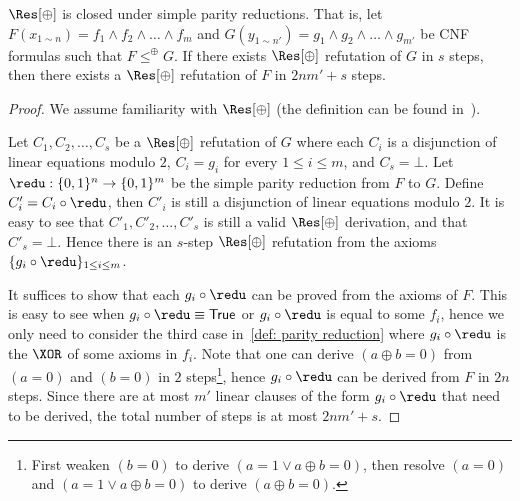 \begin{theorem}
    $\Res[\oplus]$ is closed under simple parity reductions. That is, let $F(x_{1\sim n}) = f_1\land f_2\land \dots \land f_m$ and $G(y_{1\sim {n'}}) = g_1\land g_2 \land \dots \land g_{m'}$ be CNF formulas such that $F\le^\oplus G$. If there exists $\Res[\oplus]$ refutation of $G$ in $s$ steps, then there exists a $\Res[\oplus]$ refutation of $F$ in $2nm' + s$ steps.
\end{theorem}
\begin{proof}
    We assume familiarity with $\Res[\oplus]$ (the definition can be found in~\cite{ItsyksonS20}).
    
    Let $C_1, C_2, \dots, C_s$ be a $\Res[\oplus]$ refutation of $G$ where each $C_i$ is a disjunction of linear equations modulo $2$, $C_i = g_i$ for every $1\le i\le m$, and $C_s = \bot$. Let $\redu: \{0, 1\}^n \to \{0, 1\}^m$ be the simple parity reduction from $F$ to $G$. Define $C'_i = C_i\circ \redu$, then $C'_i$ is still a disjunction of linear equations modulo $2$. It is easy to see that $C'_1, C'_2, \dots, C'_s$ is still a valid $\Res[\oplus]$ derivation, and that $C'_s = \bot$. Hence there is an $s$-step $\Res[\oplus]$ refutation from the axioms $\{g_i\circ\redu\}_{1\le i\le m}$.

    It suffices to show that each $g_i\circ\redu$ can be proved from the axioms of $F$. This is easy to see when $g_i\circ\redu\equiv {\sf True}$ or $g_i\circ\redu$ is equal to some $f_i$, hence we only need to consider the third case in~\autoref{def: parity reduction} where $g_i\circ\redu$ is the $\XOR$ of some axioms in $f_i$. Note that one can derive $(a\oplus b = 0)$ from $(a = 0)$ and $(b = 0)$ in $2$ steps\footnote{First weaken $(b = 0)$ to derive $(a = 1\lor a\oplus b = 0)$, then resolve $(a = 0)$ and $(a = 1\lor a \oplus b = 0)$ to derive $(a\oplus b = 0)$.}, hence $g_i\circ\redu$ can be derived from $F$ in $2n$ steps. Since there are at most $m'$ linear clauses of the form $g_i\circ\redu$ that need to be derived, the total number of steps is at most $2nm' + s$.
\end{proof}



